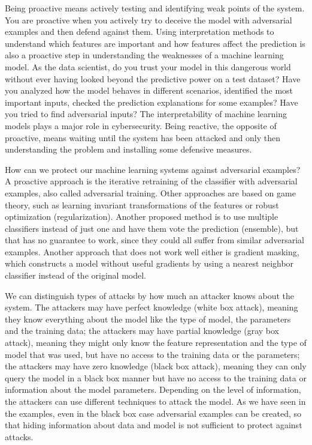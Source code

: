 \documentclass[12pt,]{krantz}
\begin{document}
Being proactive means actively testing and identifying weak points of
the system. You are proactive when you actively try to deceive the model
with adversarial examples and then defend against them. Using
interpretation methods to understand which features are important and
how features affect the prediction is also a proactive step in
understanding the weaknesses of a machine learning model. As the data
scientist, do you trust your model in this dangerous world without ever
having looked beyond the predictive power on a test dataset? Have you
analyzed how the model behaves in different scenarios, identified the
most important inputs, checked the prediction explanations for some
examples? Have you tried to find adversarial inputs? The
interpretability of machine learning models plays a major role in
cybersecurity. Being reactive, the opposite of proactive, means waiting
until the system has been attacked and only then understanding the
problem and installing some defensive measures.

How can we protect our machine learning systems against adversarial
examples? A proactive approach is the iterative retraining of the
classifier with adversarial examples, also called adversarial training.
Other approaches are based on game theory, such as learning invariant
transformations of the features or robust optimization (regularization).
Another proposed method is to use multiple classifiers instead of just
one and have them vote the prediction (ensemble), but that has no
guarantee to work, since they could all suffer from similar adversarial
examples. Another approach that does not work well either is gradient
masking, which constructs a model without useful gradients by using a
nearest neighbor classifier instead of the original model.

We can distinguish types of attacks by how much an attacker knows about
the system. The attackers may have perfect knowledge (white box attack),
meaning they know everything about the model like the type of model, the
parameters and the training data; the attackers may have partial
knowledge (gray box attack), meaning they might only know the feature
representation and the type of model that was used, but have no access
to the training data or the parameters; the attackers may have zero
knowledge (black box attack), meaning they can only query the model in a
black box manner but have no access to the training data or information
about the model parameters. Depending on the level of information, the
attackers can use different techniques to attack the model. As we have
seen in the examples, even in the black box case adversarial examples
can be created, so that hiding information about data and model is not
sufficient to protect against attacks.
\end{document}
